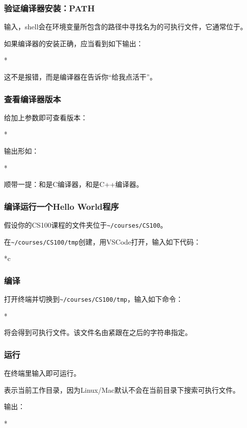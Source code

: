 \begin{frame}
    \frametitle{验证编译器安装：PATH}
    输入，shell会在环境变量所包含的路径中寻找名为的可执行文件，它通常位于。

    如果编译器的安装正确，应当看到如下输出：
    \begin{Code}*
        
    \end{Code}
    这不是报错，而是编译器在告诉你“给我点活干”。
\end{frame}

\begin{frame}
    \frametitle{查看编译器版本}
    给加上参数即可查看版本：
    \begin{Code}*
        
    \end{Code}
    输出形如：
    \begin{Code}*
        
    \end{Code}

    顺带一提：和是C编译器，和是C++编译器。
\end{frame}

\begin{frame}
    \frametitle{编译运行一个Hello World程序}
    假设你的CS100课程的文件夹位于\texttt{\textasciitilde{}/courses/CS100}。

    在\texttt{\textasciitilde{}/courses/CS100/tmp}创建，用VSCode打开，输入如下代码：
    \begin{Code}*{c}
        
    \end{Code}
\end{frame}

\begin{frame}
    \frametitle{编译}
    打开终端并切换到\texttt{\textasciitilde{}/courses/CS100/tmp}，输入如下命令：
    \begin{Code}*
        
    \end{Code}
    将会得到可执行文件。该文件名由紧跟在之后的字符串指定。
\end{frame}

\begin{frame}
    \frametitle{运行}
    在终端里输入即可运行。

    表示当前工作目录，因为Linux/Mac默认不会在当前目录下搜索可执行文件。

    输出：
    \begin{Code}*
        
    \end{Code}
\end{frame}

